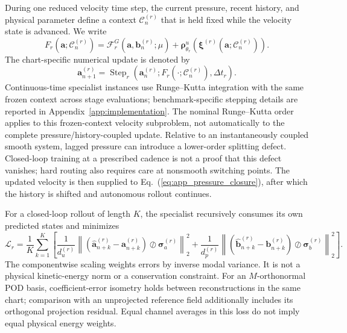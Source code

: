 \documentclass{article}
\def\plaineqref#1{\ref{#1}}
\providecommand{\DIFaddtex}[1]{{\protect\color{blue} \sf #1}} %
\providecommand{\DIFaddbegin}{} %
\providecommand{\DIFaddend}{} %
\providecommand{\DIFadd}[1]{\texorpdfstring{\DIFaddtex{#1}}{#1}} %
\providecommand{\DIFaddincludegraphics}[2][]{{\color{blue}\fbox{\DIFOincludegraphics[#1]{#2}}}} %
\DeclareRobustCommand{\DIFaddbegin}{\DIFOaddbegin \let\includegraphics\DIFaddincludegraphics} %
\DeclareRobustCommand{\DIFaddend}{\DIFOaddend \let\includegraphics\DIFOincludegraphics} %
\begin{document}
During one reduced velocity time step, the current pressure, recent history, and
physical parameter define a context $\mathcal C_n^{(r)}$ that is held fixed
while the velocity state is advanced. We write
\begin{equation}
  F_r
  \left(
    \bm a;\mathcal C_n^{(r)}
  \right)
  =
  \mathcal F_r^G
  \left(
    \bm a,\bm b_n^{(r)};\mu
  \right)
  +
  \bm\rho^u_{\theta_r}
  \left(
    \bm\xi^{(r)}
    \left(
      \bm a;\mathcal C_n^{(r)}
    \right)
  \right).
  \label{eq:app_frozen_context_rhs}
\end{equation}
The chart-specific numerical update is denoted by
\begin{equation}
  \bm a_{n+1}^{(r)}
  =
  \operatorname{Step}_r
  \left(
    \bm a_n^{(r)};
    F_r(\cdot;\mathcal C_n^{(r)}),
    \Delta t_r
  \right).
  \label{eq:app_specialist_step}
\end{equation}
Continuous-time specialist instances use Runge--Kutta integration with the
same frozen context across stage evaluations; benchmark-specific stepping
details are reported in Appendix~\ref{app:implementation}.
The \DIFaddbegin \DIFadd{nominal Runge--Kutta order applies to this frozen-context velocity subproblem, not automatically to the complete pressure/history-coupled update. Relative to an instantaneously coupled smooth system, lagged pressure can introduce a lower-order splitting defect. Closed-loop training at a prescribed cadence is not a proof that this defect vanishes; hard routing also requires care at nonsmooth switching points.
The }\DIFaddend updated velocity is then supplied to
Eq.~(\plaineqref{eq:app_pressure_closure}), after which the history is
shifted and autonomous rollout continues.

For a closed-loop rollout of length $K$, the specialist recursively
consumes its own predicted states and minimizes
\begin{equation}
  \mathcal L_r
  =
  \frac{1}{K}
  \sum_{k=1}^{K}
  \left[
    \frac{1}{d_u^{(r)}}
    \left\|
      \left(
        \widehat{\bm a}_{n+k}^{(r)}
        -
        \bm a_{n+k}^{(r)}
      \right)
      \oslash
      \bm\sigma_a^{(r)}
    \right\|_2^2
    +
    \frac{1}{d_p^{(r)}}
    \left\|
      \left(
        \widehat{\bm b}_{n+k}^{(r)}
        -
        \bm b_{n+k}^{(r)}
      \right)
      \oslash
      \bm\sigma_b^{(r)}
    \right\|_2^2
  \right].
  \label{eq:app_true_rollout_loss}
\end{equation}
\DIFaddbegin \DIFadd{The componentwise scaling weights errors by inverse modal variance. It is not a physical kinetic-energy norm or a conservation constraint. For an $M$-orthonormal POD basis, coefficient-error isometry holds between reconstructions in the same chart; comparison with an unprojected reference field additionally includes its orthogonal projection residual. Equal channel averages in this loss do not imply equal physical energy weights.
}
\end{document}
